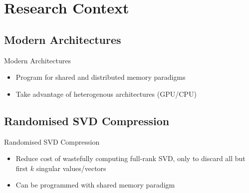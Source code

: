 \section{Research Context}

\subsection{Modern Architectures}
\begin{frame}{Modern Architectures}
    \begin{itemize}
        \item Program for shared and distributed memory paradigms \cite{Halko:2011:SIAM, Malhotra:2015:CCP,exafmm}
        \item Take advantage of heterogenous architectures (GPU/CPU) \cite{Malhotra:2015:CCP,exafmm}
    \end{itemize}
\end{frame}

\subsection{Randomised SVD Compression}
\begin{frame}{Randomised SVD Compression}
    \begin{itemize}
        \item Reduce cost of wastefully computing full-rank SVD, only to discard all but first $k$ singular values/vectors
        \item Can be programmed with shared memory paradigm \cite{mahout,Halko:2011:SIAM}
    \end{itemize}
\end{frame}

